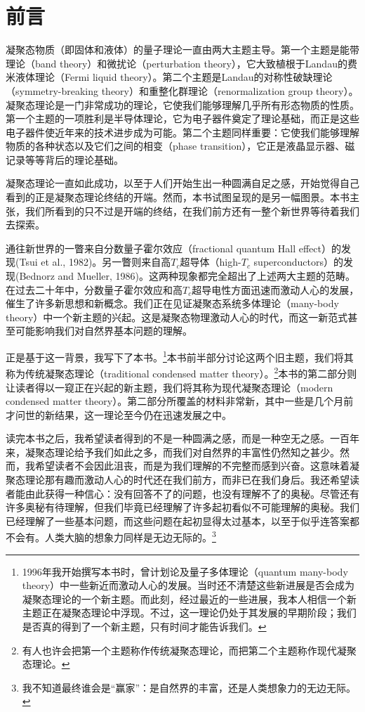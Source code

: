 
\chapter*{前言}

凝聚态物质（即固体和液体）的量子理论一直由两大主题主导。第一个主题是能带理论（band theory）和微扰论（perturbation theory），它大致植根于Landau的费米液体理论（Fermi liquid theory）。第二个主题是Landau的对称性破缺理论（symmetry-breaking theory）和重整化群理论（renormalization group theory）。凝聚态理论是一门非常成功的理论，它使我们能够理解几乎所有形态物质的性质。第一个主题的一项胜利是半导体理论，它为电子器件奠定了理论基础，而正是这些电子器件使近年来的技术进步成为可能。第二个主题同样重要：它使我们能够理解物质的各种状态以及它们之间的相变（phase transition），它正是液晶显示器、磁记录等等背后的理论基础。

凝聚态理论一直如此成功，以至于人们开始生出一种圆满自足之感，开始觉得自己看到的正是凝聚态理论终结的开端。然而，本书试图呈现的是另一幅图景。本书主张，我们所看到的只不过是开端的终结，在我们前方还有一整个新世界等待着我们去探索。

通往新世界的一瞥来自分数量子霍尔效应（fractional quantum Hall effect）的发现(Tsui et al., 1982)。另一瞥则来自高$T_c$超导体（high-$T_c$ superconductors）的发现(Bednorz and Mueller, 1986)。这两种现象都完全超出了上述两大主题的范畴。在过去二十年中，分数量子霍尔效应和高$T_c$超导电性方面迅速而激动人心的发展，催生了许多新思想和新概念。我们正在见证凝聚态系统多体理论（many-body theory）中一个新主题的兴起。这是凝聚态物理激动人心的时代，而这一新范式甚至可能影响我们对自然界基本问题的理解。

正是基于这一背景，我写下了本书。\footnote{1996年我开始撰写本书时，曾计划论及量子多体理论（quantum many-body theory）中一些新近而激动人心的发展。当时还不清楚这些新进展是否会成为凝聚态理论的一个新主题。而此刻，经过最近的一些进展，我本人相信一个新主题正在凝聚态理论中浮现。不过，这一理论仍处于其发展的早期阶段；我们是否真的得到了一个新主题，只有时间才能告诉我们。}本书前半部分讨论这两个旧主题，我们将其称为传统凝聚态理论（traditional condensed matter theory）。\footnote{有人也许会把第一个主题称作传统凝聚态理论，而把第二个主题称作现代凝聚态理论。}本书的第二部分则让读者得以一窥正在兴起的新主题，我们将其称为现代凝聚态理论（modern condensed matter theory）。第二部分所覆盖的材料非常新，其中一些是几个月前才问世的新结果，这一理论至今仍在迅速发展之中。

读完本书之后，我希望读者得到的不是一种圆满之感，而是一种空无之感。一百年来，凝聚态理论给予我们如此之多，而我们对自然界的丰富性仍然知之甚少。然而，我希望读者不会因此沮丧，而是为我们理解的不完整而感到兴奋。这意味着凝聚态理论那有趣而激动人心的时代还在我们前方，而非已在我们身后。我还希望读者能由此获得一种信心：没有回答不了的问题，也没有理解不了的奥秘。尽管还有许多奥秘有待理解，但我们毕竟已经理解了许多起初看似不可能理解的奥秘。我们已经理解了一些基本问题，而这些问题在起初显得太过基本，以至于似乎连答案都不会有。人类大脑的想象力同样是无边无际的。\footnote{我不知道最终谁会是“赢家”：是自然界的丰富，还是人类想象力的无边无际。}

